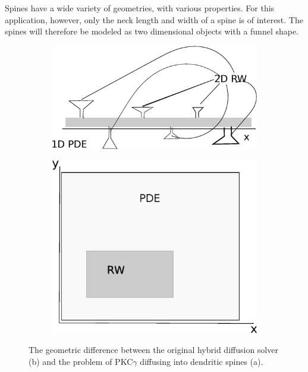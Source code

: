 \noindent Spines have a wide variety of geometries, with various properties. For this application, however, only the neck length and width of a spine is of interest. The spines will therefore be modeled as two dimensional objects with a funnel shape. 
\begin{figure}[H]
 \centering
 \begin{subfigure}{0.48\textwidth}
  \includegraphics[width=\textwidth]{Figures/dendrite_spine_model.eps}
  \caption{}
 \end{subfigure}
 \begin{subfigure}{0.48\textwidth}
  \includegraphics[width=\textwidth]{Figures/hybrid_model_principle.eps}
  \caption{}
 \end{subfigure}
 \caption[Difference between hybrid diffusion solver and dendrite - spine diffusion model]{The geometric difference between the original hybrid diffusion solver (b) and the problem of PKC$\gamma$ diffusing into dendritic spines (a). }
 \label{application:geometry_difference}
\end{figure}

